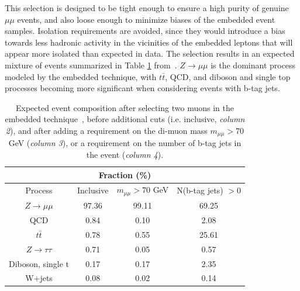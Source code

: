 This selection is designed to be tight enough to ensure a high purity of genuine $\mu\mu$ events, and also loose enough to minimize biases of the embedded event samples. Isolation requirements are avoided, since they would introduce a bias towards less hadronic activity in the vicinities of the embedded leptons that will appear more isolated than expected in data. The selection results in an expected mixture of events summarized in Table \ref{table:embedded_mixture_composition} from~\cite{CMS-TAU-18-001}. $Z \rightarrow \mu\mu$ is the dominant process modeled by the embedded technique, with $t\bar{t}$, QCD, and diboson and single top processes becoming more significant when considering events with b-tag jets.


\begin{table}[ht]
    \centering
    \begin{tabular}{|cccc|}
    \hline
    \multicolumn{4}{|c|}{Fraction (\%)}                                                                                                             \\ \hline
    \multicolumn{1}{|c|}{Process}                  & \multicolumn{1}{c|}{Inclusive} & \multicolumn{1}{c|}{$m_{\mu\mu} > 70$ GeV} & N(b-tag jets) $> 0$ \\ \hline
    \multicolumn{1}{|c|}{$Z \rightarrow \mu\mu$}   & \multicolumn{1}{c|}{97.36}     & \multicolumn{1}{c|}{99.11}                 & 69.25            \\
    \multicolumn{1}{|c|}{QCD}                      & \multicolumn{1}{c|}{0.84}      & \multicolumn{1}{c|}{0.10}                  & 2.08             \\
    \multicolumn{1}{|c|}{$t\bar{t}$}               & \multicolumn{1}{c|}{0.78}      & \multicolumn{1}{c|}{0.55}                  & 25.61            \\
    \multicolumn{1}{|c|}{$Z \rightarrow \tau\tau$} & \multicolumn{1}{c|}{0.71}      & \multicolumn{1}{c|}{0.05}                  & 0.57             \\
    \multicolumn{1}{|c|}{Diboson, single t}        & \multicolumn{1}{c|}{0.17}      & \multicolumn{1}{c|}{0.17}                  & 2.35             \\
    \multicolumn{1}{|c|}{W+jets}                   & \multicolumn{1}{c|}{0.08}      & \multicolumn{1}{c|}{0.02}                  & 0.14             \\ \hline
    \end{tabular}
    \caption[Expected event composition after selecting two muons in the embedded technique, before additional cuts (i.e. inclusive), and after adding a requirement on the di-muon mass $m_{\mu\mu} > 70$ GeV, or a requirement on the number of b-tag jets in the event.]{Expected event composition after selecting two muons in the embedded technique~\cite{CMS-TAU-18-001}, before additional cuts (i.e. inclusive, \textit{column 2}), and after adding a requirement on the di-muon mass $m_{\mu\mu} > 70$ GeV (\textit{column 3}), or a requirement on the number of b-tag jets in the event (\textit{column 4}).}
    \label{table:embedded_mixture_composition}
\end{table}

